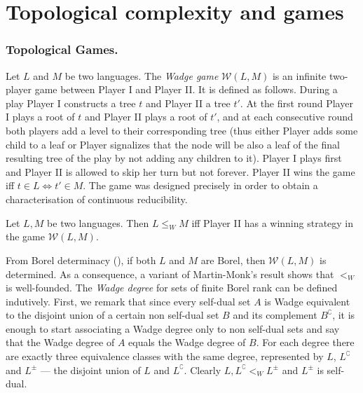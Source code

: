 \section{Topological complexity and games}\label{section:games}
\subsubsection*{Topological Games.}
Let $L$ and $M$ be two languages. The {\em Wadge game}
$\mathcal{W}(L, M)$ is an infinite two-player game between Player I and Player II. It is defined as follows. During a play Player I constructs a tree $t$ and Player II a tree $t'$. At the first round Player I plays a root of $t$ and Player II plays a root of $t'$, and at each consecutive round both players add a level
to their corresponding tree (thus either Player adds some child to a leaf or Player signalizes that the node will be also a leaf of the final resulting tree of the play by not adding any children to it).
Player I plays first and Player II is allowed to
skip her turn but not forever.  Player II wins the game iff $t \in L
\Leftrightarrow t' \in M$.  
The game was designed precisely in order to obtain a characterisation of continuous reducibility.
\begin{lemma}\label{lemma:wadge}
Let $L, M$ be two languages. Then  $L \leq_W M$ iff Player II has a winning strategy in the game $\mathcal{W}(L, M)$.
\end{lemma}
From Borel determinacy (\cite{martin}),
if both $L$ and $M$ are Borel, then $\mathcal{W}(L, M)$ is determined.
As a consequence, a variant of Martin-Monk's result shows that $<_W$ is
well-founded. The \emph{Wadge degree} for sets of finite Borel rank can
be %
defined indutively. First, we remark that since every self-dual set $A$ is Wadge equivalent to the disjoint union of a certain non self-dual set $B$ and its complement $B^\complement$, it is enough to start associating a Wadge degree only to non self-dual sets and say that the Wadge degree of $A$ equals the Wadge degree of $B$. 
For each degree there are exactly three equivalence
classes with the same degree, represented by $L$, $L^\complement$ and
$L^\pm$ --- the disjoint union of $L$ and $L^\complement$. %
Clearly $L, L^\complement <_W L^\pm$ and
$L^\pm$ is self-dual.

